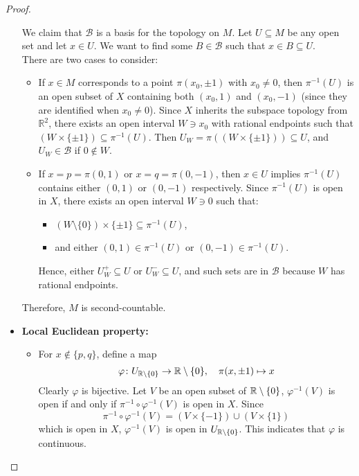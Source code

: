 \begin{problem}
\begin{proof}
\begin{itemize}
      We claim that $\mathcal{B}$ is a basis for the topology on $M$. Let $U \subseteq M$ be any open set and let $x \in U$. We want to find some $B \in \mathcal{B}$ such that $x \in B \subseteq U$.\\
      There are two cases to consider:
      \begin{itemize}
        \item If $x \in M$ corresponds to a point $\pi(x_0, \pm 1)$ with $x_0 \neq 0$, then $\pi^{-1}(U)$ is an open subset of $X$ containing both $(x_0, 1)$ and $(x_0, -1)$ (since they are identified when $x_0 \ne 0$). Since $X$ inherits the subspace topology from $\mathbb{R}^2$, there exists an open interval $W \ni x_0$ with rational endpoints such that $(W \times \{\pm 1\}) \subseteq \pi^{-1}(U)$. Then $U_W = \pi((W \times \{\pm 1\})) \subseteq U$, and $U_W \in \mathcal{B}$ if $0 \notin W$.
        \item If $x = p = \pi(0, 1)$ or $x = q = \pi(0, -1)$, then $x \in U$ implies $\pi^{-1}(U)$ contains either $(0,1)$ or $(0,-1)$ respectively. Since $\pi^{-1}(U)$ is open in $X$, there exists an open interval $W \ni 0$ such that:
        \begin{itemize}
          \item $(W \setminus \{0\}) \times \{\pm 1\} \subseteq \pi^{-1}(U)$,
          \item and either $(0,1) \in \pi^{-1}(U)$ or $(0,-1) \in \pi^{-1}(U)$.
        \end{itemize}
        Hence, either $U_W^+ \subseteq U$ or $U_W^- \subseteq U$, and such sets are in $\mathcal{B}$ because $W$ has rational endpoints.
      \end{itemize}
      Therefore, $M$ is second-countable.
      \item \textbf{Local Euclidean property:} 
      \begin{itemize}
        \item For $x \notin \{p, q\}$, define a map
        \begin{equation*}
          \varphi \colon U_{\mathbb{R} \setminus \{0\}} \rightarrow \mathbb{R} \setminus \{0\}, \quad \pi(x, \pm 1) \mapsto x
        \end{equation*}
        Clearly $\varphi$ is bijective. Let $V$ be an open subset of $\mathbb{R} \setminus \{0\}$, $\varphi^{-1}(V)$ is open if and only if $\pi^{-1} \circ \varphi^{-1}(V)$ is open in $X$. Since
        \begin{equation*}
          \pi^{-1} \circ \varphi^{-1}(V) = (V \times \{-1\}) \cup (V \times \{1\})
        \end{equation*}
        which is open in $X$, $\varphi^{-1}(V)$ is open in $U_{\mathbb{R} \setminus \{0\}}$. This indicates that $\varphi$ is continuous.


\end{itemize}
\end{itemize}
\end{proof}
\end{problem}
